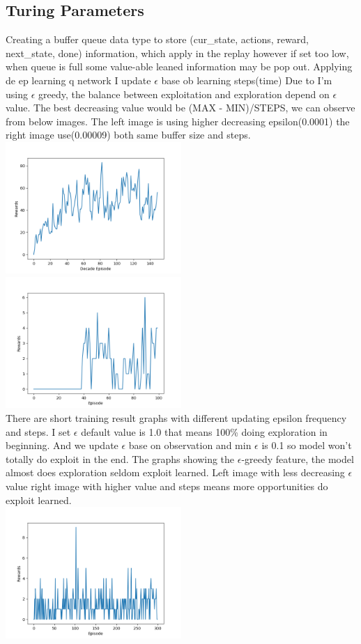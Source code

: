 \documentclass[a4paper, 11pt]{article}
\begin{document}
\subsection*{Turing Parameters}
Creating a buffer queue data type to store (cur\_state, actions, reward, next\_state, done) information, which apply in the replay however if set too low, when queue is full some value-able leaned information may be pop out. Applying de ep learning q network I update $\epsilon$ base ob learning steps(time) Due to I'm using $\epsilon$ greedy, the balance between exploitation and exploration depend on $\epsilon$ value. The best decreasing value would be (MAX - MIN)/STEPS, we can observe from below images. The left image is using higher decreasing epsilon(0.0001) the right image use(0.00009) both same buffer size and steps.\\
\includegraphics[height = 5cm]{decases.png}
\includegraphics[height = 5cm]{test.png}\\
There are short training result graphs with different updating epsilon frequency and steps. I set $\epsilon$ default value is 1.0 that means 100\% doing exploration in beginning. And we update $\epsilon$  base on observation and min $\epsilon$ is 0.1 so model won't totally do exploit in the end. The graphs showing the $\epsilon$-greedy feature, the model almost does exploration seldom exploit learned. Left image with less decreasing $\epsilon$ value right image with higher value and steps means more opportunities do exploit learned.\\
\includegraphics[height = 5cm]{low.png}
\end{document}
